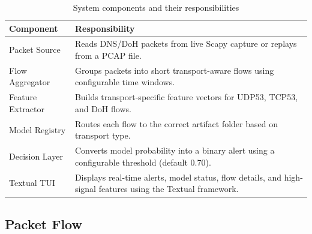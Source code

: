 \documentclass[12pt,a4paper]{article}
\begin{document}
\begin{table}[H]
\centering
\begin{tabular}{@{}lp{9cm}@{}}
\toprule
\textbf{Component} & \textbf{Responsibility} \\
\midrule
Packet Source & Reads DNS/DoH packets from live Scapy capture or replays from a PCAP file. \\
Flow Aggregator & Groups packets into short transport-aware flows using configurable time windows. \\
Feature Extractor & Builds transport-specific feature vectors for UDP53, TCP53, and DoH flows. \\
Model Registry & Routes each flow to the correct artifact folder based on transport type. \\
Decision Layer & Converts model probability into a binary alert using a configurable threshold (default 0.70). \\
Textual TUI & Displays real-time alerts, model status, flow details, and high-signal features using the Textual framework. \\
\bottomrule
\end{tabular}
\caption{System components and their responsibilities}
\end{table}

\subsection{Packet Flow}
\end{document}
